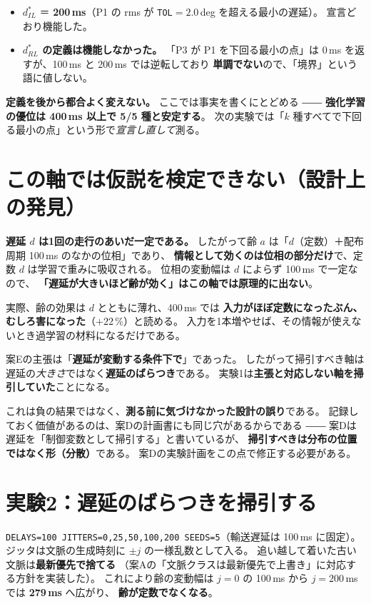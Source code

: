 \documentclass[11pt,a4paper]{article}
\newcommand{\code}[1]{\texttt{#1}}
\newcommand{\prob}[1]{\textbf{\textcolor{red!55!black}{#1}}}
\newcommand{\keyp}[1]{\textbf{\textcolor{blue!45!black}{#1}}}
\begin{document}
\begin{itemize}[leftmargin=1.4em,itemsep=3pt]
  \item $d^{*}_{IL}$ ＝ \keyp{200\,ms}（P1 の rms が \code{TOL}$=2.0$\,deg を超える最小の遅延）。
        宣言どおり機能した。
  \item \prob{$d^{*}_{RL}$ の定義は機能しなかった。}
        「P3 が P1 を下回る最小の点」は 0\,ms を返すが、100\,ms と 200\,ms では逆転しており
        \prob{単調でない}ので、「境界」という語に値しない。
\end{itemize}

\noindent
\keyp{定義を後から都合よく変えない。} ここでは事実を書くにとどめる ――
\keyp{強化学習の優位は 400\,ms 以上で 5/5 種と安定する}。
次の実験では「$k$ 種すべてで下回る最小の点」という形で\emph{宣言し直して}測る。

\section{この軸では仮説を検定できない（設計上の発見）}
\label{sec:flaw}

\prob{遅延 $d$ は1回の走行のあいだ一定である。}
したがって齢 $a$ は「$d$（定数）＋配布周期 100\,ms のなかの位相」であり、
\keyp{情報として効くのは位相の部分だけ}で、定数 $d$ は学習で重みに吸収される。
位相の変動幅は $d$ によらず 100\,ms で一定なので、
\prob{「遅延が大きいほど齢が効く」はこの軸では原理的に出ない}。

実際、齢の効果は $d$ とともに薄れ、400\,ms では
\keyp{入力がほぼ定数になったぶん、むしろ害になった}（$+22\,\%$）と読める。
入力を1本増やせば、その情報が使えないとき過学習の材料になるだけである。

\medskip
\noindent
案Eの主張は「\keyp{遅延が変動する条件下で}」であった。
したがって掃引すべき軸は遅延の\emph{大きさ}ではなく\keyp{遅延のばらつき}である。
実験1は\prob{主張と対応しない軸を掃引していた}ことになる。

\medskip
\noindent
これは負の結果ではなく、\keyp{測る前に気づけなかった設計の誤り}である。
記録しておく価値があるのは、案Dの計画書にも同じ穴があるからである ――
案Dは遅延を「制御変数として掃引する」と書いているが、
\keyp{掃引すべきは分布の位置ではなく形（分散）}である。
案Dの実験計画をこの点で修正する必要がある。

\section{実験2：遅延のばらつきを掃引する}
\label{sec:e2}

\code{DELAYS=100 JITTERS=0,25,50,100,200 SEEDS=5}（輸送遅延は 100\,ms に固定）。
ジッタは文脈の生成時刻に $\pm j$ の一様乱数として入る。
追い越して着いた古い文脈は\keyp{最新優先で捨てる}
（案Aの「文脈クラスは最新優先で上書き」に対応する方針を実装した）。
これにより齢の変動幅は $j=0$ の 100\,ms から $j=200$\,ms では \keyp{279\,ms} へ広がり、
\keyp{齢が定数でなくなる}。
\end{document}
